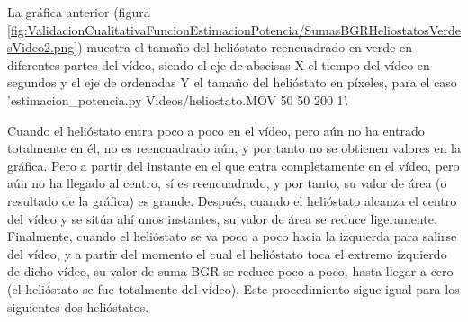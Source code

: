 La gráfica anterior (figura \ref{fig:ValidacionCualitativaFuncionEstimacionPotencia/SumasBGRHeliostatosVerdesVideo2.png}) muestra el tamaño del helióstato reencuadrado en verde en diferentes partes del vídeo, siendo el eje de abscisas X el tiempo del vídeo en segundos y el eje de ordenadas Y el tamaño del helióstato en píxeles, para el caso 'estimacion\_potencia.py Videos/heliostato.MOV 50 50 200 1'.

Cuando el helióstato entra poco a poco en el vídeo, pero aún no ha entrado totalmente en él, no es reencuadrado aún, y por tanto no se obtienen valores en la gráfica. Pero a partir del instante en el que entra completamente en el vídeo, pero aún no ha llegado al centro, sí es reencuadrado, y por tanto, su valor de área (o resultado de la gráfica) es grande. Después, cuando el helióstato alcanza el centro del vídeo y se sitúa ahí unos instantes, su valor de área se reduce ligeramente. Finalmente, cuando el helióstato se va poco a poco hacia la izquierda para salirse del vídeo, y a partir del momento el cual el helióstato toca el extremo izquierdo de dicho vídeo, su valor de suma BGR se reduce poco a poco, hasta llegar a cero (el helióstato se fue totalmente del vídeo). Este procedimiento sigue igual para los siguientes dos helióstatos.
